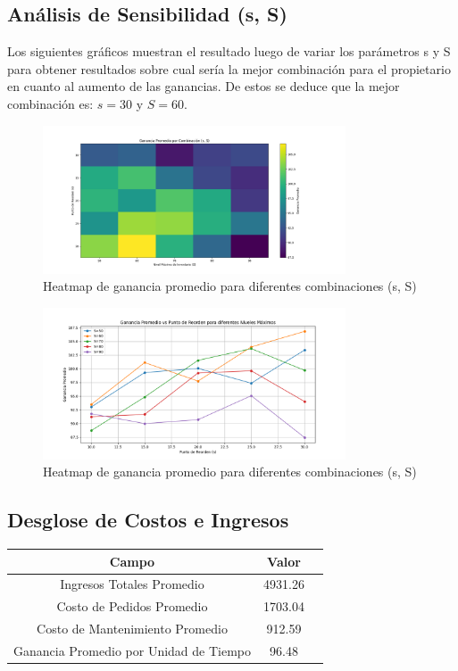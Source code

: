 \documentclass{article}
\begin{document}
\subsection{Análisis de Sensibilidad (s, S)}

Los siguientes gráficos muestran el resultado luego de variar los parámetros
s y S para obtener resultados sobre cual sería la mejor combinación para el propietario en cuanto al 
aumento de las ganancias. De estos se deduce que la mejor combinación es: $s=30$ y $S=60$.

\begin{figure}[h]
    \centering
    \includegraphics[width=0.8\textwidth]{images/Ganancia Promedio por Combinacion (s,S).png}
    \caption{Heatmap de ganancia promedio para diferentes combinaciones (s, S)}
\end{figure}

\begin{figure}[h]
    \centering
    \includegraphics[width=0.8\textwidth]{images/Ganancia Promedio por Combinacion(s,S) por puntos.png}
    \caption{Heatmap de ganancia promedio para diferentes combinaciones (s, S)}
\end{figure}

\newpage
\subsection{Desglose de Costos e Ingresos}

\begin{tabular}{|c|c|c|}  %
    \hline                       %
    \textbf{Campo}                          & \textbf{Valor} \\ \hline
    Ingresos Totales Promedio               & 4931.26         \\ \hline
    Costo de Pedidos Promedio               & 1703.04          \\ \hline
    Costo de Mantenimiento Promedio         & 912.59          \\ \hline
    Ganancia Promedio por Unidad de Tiempo  & 96.48          \\ \hline
    \end{tabular}
\end{document}
